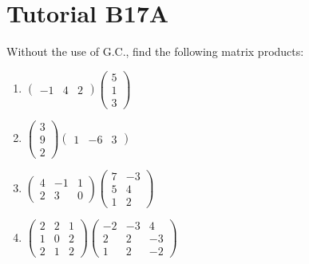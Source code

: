 \section{Tutorial B17A}

\begin{problem}
    Without the use of G.C., find the following matrix products:
    \begin{enumerate}
        \item $\begin{pmatrix}
            -1 & 4 & 2
        \end{pmatrix}
        \begin{pmatrix}
            5\\
            1\\
            3
        \end{pmatrix}$
        \item $\begin{pmatrix}
            3\\
            9\\
            2
        \end{pmatrix}
        \begin{pmatrix}
            1 & -6 & 3
        \end{pmatrix}$
        \item $\begin{pmatrix}
            4 & -1 & 1\\2&3&0
        \end{pmatrix}
        \begin{pmatrix}
            7 & -3\\
            5 & 4\\
            1 & 2
        \end{pmatrix}$
        \item $\begin{pmatrix}
            2 & 2 & 1\\1 & 0 & 2\\2 & 1 & 2
        \end{pmatrix}
        \begin{pmatrix}
            -2 & -3 & 4\\2 & 2 & -3\\1 & 2 & -2
        \end{pmatrix}$
    \end{enumerate}
\end{problem}
